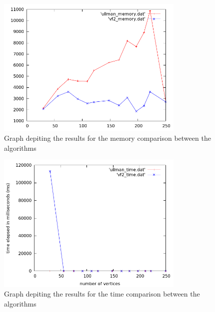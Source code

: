 \label{Experiment Results}


\begin{figure}[H]
  \begin{center}
      \includegraphics[width=0.8\textwidth]{memory_comparison.png}
  \end{center}    
  \caption{Graph depiting the results for the memory comparison between the algorithms}
  \label{fig:memory_comparison}
\end{figure}

\begin{figure}[H]
  \begin{center}
      \includegraphics[width=0.8\textwidth]{time_comparison.png}
  \end{center}    
  \caption{Graph depiting the results for the time comparison between the algorithms}
  \label{fig:time_comparison}
\end{figure}